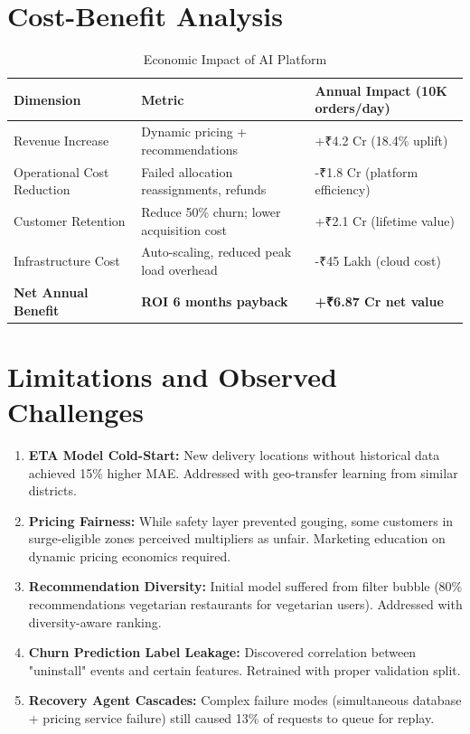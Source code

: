 \documentclass[12pt,a4paper]{report}
\begin{document}
\begin{itemize}
\section{Cost-Benefit Analysis}

\begin{table}[H]
\centering
\caption{Economic Impact of AI Platform}
\begin{tabular}{p{3.5cm} p{3cm} p{4cm}}
\toprule
\textbf{Dimension} & \textbf{Metric} & \textbf{Annual Impact (10K orders/day)} \\
\midrule
Revenue Increase & Dynamic pricing + recommendations & +₹4.2 Cr (18.4\% uplift) \\
Operational Cost Reduction & Failed allocation reassignments, refunds & -₹1.8 Cr (platform efficiency) \\
Customer Retention & Reduce 50\% churn; lower acquisition cost & +₹2.1 Cr (lifetime value) \\
Infrastructure Cost & Auto-scaling, reduced peak load overhead & -₹45 Lakh (cloud cost) \\
\textbf{Net Annual Benefit} & \textbf{ROI 6 months payback} & \textbf{+₹6.87 Cr net value} \\
\bottomrule
\end{tabular}
\end{table}

\section{Limitations and Observed Challenges}

\begin{enumerate}
    \item \textbf{ETA Model Cold-Start:} New delivery locations without historical data achieved 15\% higher MAE. Addressed with geo-transfer learning from similar districts.
    \item \textbf{Pricing Fairness:} While safety layer prevented gouging, some customers in surge-eligible zones perceived multipliers as unfair. Marketing education on dynamic pricing economics required.
    \item \textbf{Recommendation Diversity:} Initial model suffered from filter bubble (80\% recommendations vegetarian restaurants for vegetarian users). Addressed with diversity-aware ranking.
    \item \textbf{Churn Prediction Label Leakage:} Discovered correlation between "uninstall" events and certain features. Retrained with proper validation split.
    \item \textbf{Recovery Agent Cascades:} Complex failure modes (simultaneous database + pricing service failure) still caused 13\% of requests to queue for replay.
\end{enumerate}


\end{itemize}
\end{document}
